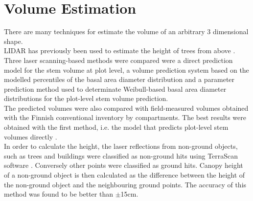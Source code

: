\section{Volume Estimation}
\label{design:volume estimation}
There are many techniques for estimate the volume of an arbitrary 3 dimensional shape. \\

LIDAR has previously been used to estimate the height of trees from above \cite{Maltamo2006}.\\
 
Three  laser scanning-based methods were compared were a direct prediction model for the stem volume at plot level, a volume
prediction system based on the modelled percentiles of the basal area diameter distribution and a parameter prediction method used to determinate Weibull-based basal area diameter distributions for the plot-level stem volume prediction. \\

The predicted volumes were also compared with field-measured volumes obtained with the Finnish conventional inventory by compartments. 
The best results were obtained with the first method, i.e. the model that predicts plot-level stem volumes directly \cite{Maltamo2006}.\\

In order to calculate the height, the laser reflections from non-ground objects, such as trees and buildings were classified as non-ground hits using TerraScan software \cite{Solid2013}. Conversely other points were classified as ground hits.
Canopy height of a non-ground object is then calculated as the difference between the height of the non-ground object and the neighbouring ground points. 
The accuracy of this method was found to be better than $\pm$15cm\cite{Maltamo2006}.\\